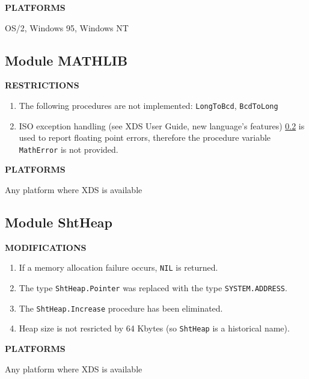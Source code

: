 {\bf PLATFORMS}

  OS/2, Windows 95, Windows NT


\subsection{Module MATHLIB}

{\bf RESTRICTIONS}

\begin{enumerate}
\item The following procedures are not implemented:
      \verb'LongToBcd',
      \verb'BcdToLong'

\item ISO \mt{} exception handling (see XDS User Guide, new language's 
      features) \ref{} is used to report floating point errors,
      therefore the procedure variable \verb'MathError' is not provided.
\end{enumerate}

{\bf PLATFORMS}

  Any platform where XDS is available


\subsection{Module ShtHeap}

{\bf MODIFICATIONS}

\begin{enumerate}
\item If a memory allocation failure occurs, \verb'NIL' is returned.

\item The type \verb'ShtHeap.Pointer' was replaced with the type
      \verb'SYSTEM.ADDRESS'.

\item The \verb'ShtHeap.Increase' procedure has been eliminated.

\item Heap size is not resricted by 64 Kbytes (so \verb'ShtHeap' is a 
      historical name).
\end{enumerate}

{\bf PLATFORMS}

  Any platform where XDS is available


